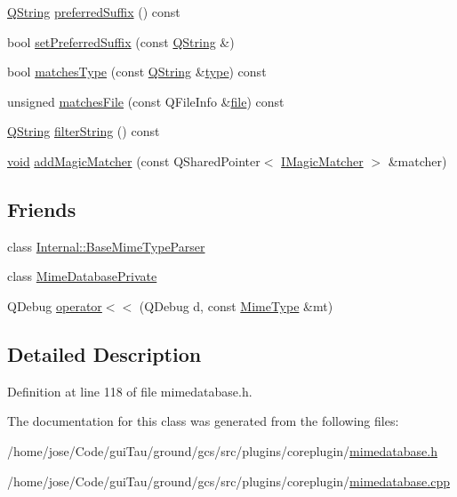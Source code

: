 \begin{DoxyCompactItemize}
\hyperlink{group___u_a_v_objects_plugin_gab9d252f49c333c94a72f97ce3105a32d}{Q\-String} \hyperlink{group___core_plugin_ga8951b896132754af79a17a9875d48aba}{preferred\-Suffix} () const 
\item 
bool \hyperlink{group___core_plugin_ga6bbf75571b9386bdef65e32b532bdf17}{set\-Preferred\-Suffix} (const \hyperlink{group___u_a_v_objects_plugin_gab9d252f49c333c94a72f97ce3105a32d}{Q\-String} \&)
\item 
bool \hyperlink{group___core_plugin_gae6e8bb4b51c90fdbc1ff3a06feb608dd}{matches\-Type} (const \hyperlink{group___u_a_v_objects_plugin_gab9d252f49c333c94a72f97ce3105a32d}{Q\-String} \&\hyperlink{glext_8h_a7d05960f4f1c1b11f3177dc963a45d86}{type}) const 
\item 
unsigned \hyperlink{group___core_plugin_gad2a83cd6a3497a5250760912c4cf765d}{matches\-File} (const Q\-File\-Info \&\hyperlink{uavobjecttemplate_8m_a97c04efa65bcf0928abf9260bc5cbf46}{file}) const 
\item 
\hyperlink{group___u_a_v_objects_plugin_gab9d252f49c333c94a72f97ce3105a32d}{Q\-String} \hyperlink{group___core_plugin_gaf9cafbc06029145ed37653154dc98322}{filter\-String} () const 
\item 
\hyperlink{group___u_a_v_objects_plugin_ga444cf2ff3f0ecbe028adce838d373f5c}{void} \hyperlink{group___core_plugin_ga520da2732b236a8aa18784ae485668bc}{add\-Magic\-Matcher} (const Q\-Shared\-Pointer$<$ \hyperlink{class_core_1_1_i_magic_matcher}{I\-Magic\-Matcher} $>$ \&matcher)
\end{DoxyCompactItemize}
\subsection*{Friends}
\begin{DoxyCompactItemize}
\item 
class \hyperlink{group___core_plugin_gaede3caef30fcd32e46c58bcee0316978}{Internal\-::\-Base\-Mime\-Type\-Parser}
\item 
class \hyperlink{group___core_plugin_gaed8cc5f0fa519bf8b2eb85b880f76d7c}{Mime\-Database\-Private}
\item 
Q\-Debug \hyperlink{group___core_plugin_ga0642e8bd073fde915ffb78e5b2245d8e}{operator$<$$<$} (Q\-Debug d, const \hyperlink{class_core_1_1_mime_type}{Mime\-Type} \&mt)
\end{DoxyCompactItemize}


\subsection{Detailed Description}


Definition at line 118 of file mimedatabase.\-h.



The documentation for this class was generated from the following files\-:\begin{DoxyCompactItemize}
\item 
/home/jose/\-Code/gui\-Tau/ground/gcs/src/plugins/coreplugin/\hyperlink{mimedatabase_8h}{mimedatabase.\-h}\item 
/home/jose/\-Code/gui\-Tau/ground/gcs/src/plugins/coreplugin/\hyperlink{mimedatabase_8cpp}{mimedatabase.\-cpp}\end{DoxyCompactItemize}
